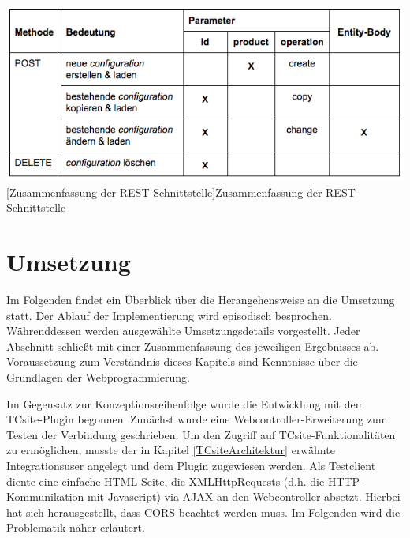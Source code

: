 \documentclass[11pt, a4paper, titlepage, listof=totoc, bibliography=totoc, index=totoc, twoside, openright, headings=normal]{scrreprt}
\begin{document}
\vspace{1em}
\begin{minipage}{\linewidth}
	\centering
	\includegraphics[width=1\linewidth]{Abbildungen/konzeptRestZusammenfassung.png}
	[Zusammenfassung der REST-Schnittstelle]{Zusammenfassung der REST-Schnittstelle}
	\label{tab:konzeptRestZusammenfassung}
\end{minipage}
\vspace{1em}

\chapter{Umsetzung}
\label{Umsetzung}
Im Folgenden findet ein Überblick über die Herangehensweise an die Umsetzung statt. Der Ablauf der Implementierung wird episodisch besprochen. Währenddessen werden ausgewählte Umsetzungsdetails vorgestellt. Jeder Abschnitt schließt mit einer Zusammenfassung des jeweiligen Ergebnisses ab. Voraussetzung zum Verständnis dieses Kapitels sind Kenntnisse über die Grundlagen der Webprogrammierung.

Im Gegensatz zur Konzeptionsreihenfolge wurde die Entwicklung mit dem TCsite-Plugin begonnen. Zunächst wurde eine Webcontroller-Erweiterung zum Testen der Verbindung geschrieben. Um den Zugriff auf TCsite-Funktionalitäten zu ermöglichen, musste der in Kapitel \ref{TCsiteArchitektur} erwähnte Integrationsuser angelegt und dem Plugin zugewiesen werden. Als Testclient diente eine einfache HTML-Seite, die XMLHttpRequests (d.h. die HTTP-Kommunikation mit Javascript) via \ac{AJAX} an den Webcontroller absetzt. Hierbei hat sich herausgestellt, dass  \ac{CORS} beachtet werden muss. Im Folgenden wird die Problematik näher erläutert.
\end{document}

